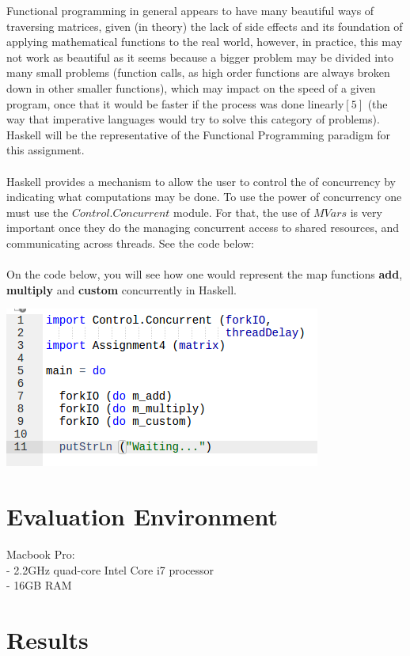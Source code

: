 \documentclass[conference]{IEEEtran}
\begin{document}
Functional programming in general appears to have many beautiful ways of traversing matrices, given (in theory) the lack of side effects and its foundation of applying mathematical functions to the real world, however, in practice, this may not work as beautiful as it seems because a bigger problem may be divided into many small problems (function calls, as high order functions are always broken down in other smaller functions), which may impact on the speed of a given program, once that it would be faster if the process was done linearly$[5]$ (the way that imperative languages would try to solve this category of problems). Haskell will be the representative of the Functional Programming paradigm for this assignment.
\\\\
Haskell provides a mechanism to allow the user to control the of concurrency by indicating what computations may be done. To use the power of concurrency one must use the $Control.Concurrent$ module. For that, the use of $MVars$ is very important once they do the managing concurrent access to shared resources, and communicating across threads. See the code below:
\\\\
On the code below, you will see how one would represent the map functions \textbf{add}, \textbf{multiply} and \textbf{custom} concurrently in Haskell.

\includegraphics[scale=0.60]{haskell_code_5}

\section{Evaluation Environment}
Macbook Pro:\\
- 2.2GHz quad-core Intel Core i7 processor\\
- 16GB RAM

\section{Results}
\end{document}
